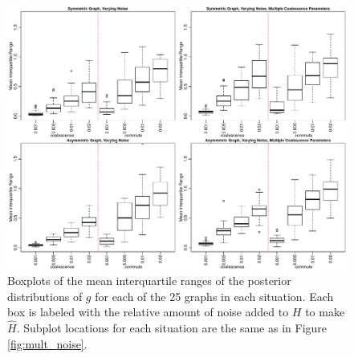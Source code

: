 \documentclass{article}
\begin{document}
\begin{figure}
\centering
\includegraphics[scale=.6]{figs/mult_noise_iqr}
\caption{Boxplots of the mean interquartile ranges of the posterior distributions of $g$
for each of the 25 graphs in each situation.
Each box is labeled with the relative amount of noise added to $H$ to make $\hat{H}$.
Subplot locations for each situation are the same as in Figure \ref{fig:mult_noise}.
}
\label{fig:mult_noise_iqr}
\end{figure}
\end{document}
